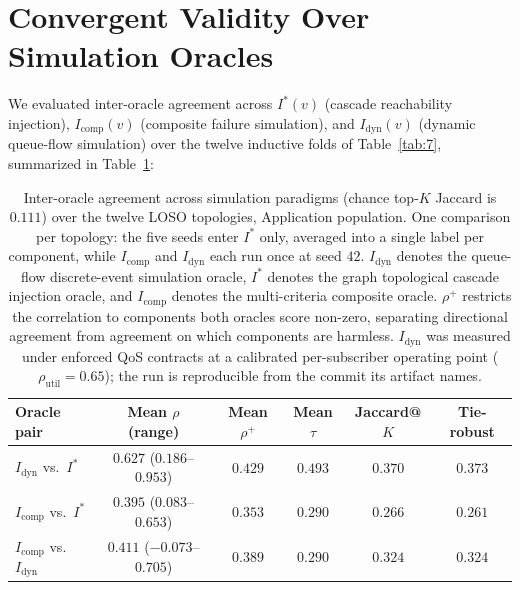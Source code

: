 \documentclass[preprint,3p]{elsarticle}
\begin{document}
\setlength{\bibsep}{0.5pt}



\section{Convergent Validity Over Simulation Oracles}
\label{supp:convergent}

We evaluated inter-oracle agreement across $I^*(v)$ (cascade reachability injection), $I_{\text{comp}}(v)$ (composite failure simulation), and $I_{\text{dyn}}(v)$ (dynamic queue-flow simulation) over the twelve inductive folds of Table~\ref{tab:7}, summarized in Table~\ref{tab:supp-oracles}:

\begin{table}[htbp]
\centering
\small
\caption{Inter-oracle agreement across simulation paradigms (chance top-$K$ Jaccard is $0.111$) over the twelve LOSO topologies, Application population. One comparison per topology: the five seeds enter $I^*$ only, averaged into a single label per component, while $I_{\text{comp}}$ and $I_{\text{dyn}}$ each run once at seed $42$. $I_{\text{dyn}}$ denotes the queue-flow discrete-event simulation oracle, $I^*$ denotes the graph topological cascade injection oracle, and $I_{\text{comp}}$ denotes the multi-criteria composite oracle. $\rho^{+}$ restricts the correlation to components both oracles score non-zero, separating directional agreement from agreement on which components are harmless. $I_{\text{dyn}}$ was measured under enforced QoS contracts at a calibrated per-subscriber operating point ($\rho_{\text{util}} = 0.65$); the run is reproducible from the commit its artifact names.}
\label{tab:supp-oracles}
\begin{tabular}{lccccc}
\toprule
\textbf{Oracle pair} & \textbf{Mean $\rho$ (range)} & \textbf{Mean $\rho^{+}$} & \textbf{Mean $\tau$} & \textbf{Jaccard@$K$} & \textbf{Tie-robust} \\
\midrule
$I_{\text{dyn}}$ vs.\ $I^*$ & $\mathbf{0.627}$ ($0.186$--$0.953$) & $0.429$ & $0.493$ & $0.370$ & $0.373$ \\
$I_{\text{comp}}$ vs.\ $I^*$ & $0.395$ ($0.083$--$0.653$) & $0.353$ & $0.290$ & $0.266$ & $0.261$ \\
$I_{\text{comp}}$ vs.\ $I_{\text{dyn}}$ & $0.411$ ($-0.073$--$0.705$) & $0.389$ & $0.290$ & $0.324$ & $0.324$ \\
\bottomrule
\end{tabular}
\end{table}
\end{document}
